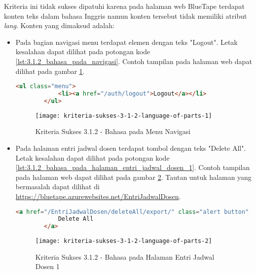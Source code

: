 Kriteria ini tidak sukses dipatuhi karena pada halaman web BlueTape terdapat konten teks dalam bahasa Inggris namun konten tersebut tidak memiliki atribut \textit{lang}. Konten yang dimaksud adalah:

\begin{itemize}
    \item Pada bagian navigasi menu terdapat elemen dengan teks "Logout". Letak kesalahan dapat dilihat pada potongan kode \ref{lst:3.1.2_bahasa_pada_navigasi}. Contoh tampilan pada halaman web dapat dilihat pada gambar \ref{fig:3.1.2_language_of_parts_1}. 
    \begin{lstlisting}[frame=single, label={lst:3.1.2_bahasa_pada_navigasi}, language=HTML, caption=Kriteria Sukses 3.1.2 - Bahasa yang Tidak Sesuai pada Menu Navigasi]
        <ul class="menu">
            <li><a href="/auth/logout">Logout</a></li>
        </ul>
    \end{lstlisting}
    
    \begin{figure}[H]
        \centering  
        \texttt{[image: kriteria-sukses-3-1-2-language-of-parts-1]}  
        \caption[Kriteria Sukses 3.1.2 - Bahasa pada Menu Navigasi]{Kriteria Sukses 3.1.2 - Bahasa pada Menu Navigasi}
        \label{fig:3.1.2_language_of_parts_1}  
    \end{figure}

    \item Pada halaman entri jadwal dosen terdapat tombol dengan teks "Delete All". Letak kesalahan dapat dilihat pada potongan kode \ref{lst:3.1.2_bahasa_pada_halaman_entri_jadwal_dosen_1}. Contoh tampilan pada halaman web dapat dilihat pada gambar \ref{fig:3.1.2_language_of_parts_2}. Tautan untuk halaman yang bermasalah dapat dilihat di \url{https://bluetape.azurewebsites.net/EntriJadwalDosen}.
    \begin{lstlisting}[frame=single, label={lst:3.1.2_bahasa_pada_halaman_entri_jadwal_dosen_1}, language=HTML, caption=Kriteria Sukses 3.1.2 - Bahasa yang Tidak Sesuai pada Halaman Entri Jadwal Dosen 1]
        <a href="/EntriJadwalDosen/deleteAll/export/" class="alert button" onClick="return konfirmasi();">
            Delete All
        </a>
    \end{lstlisting}
    
    \begin{figure}[H]
        \centering  
        \texttt{[image: kriteria-sukses-3-1-2-language-of-parts-2]}  
        \caption[Kriteria Sukses 3.1.2 - Bahasa pada Halaman Entri Jadwal Dosen 1]{Kriteria Sukses 3.1.2 - Bahasa pada Halaman Entri Jadwal Dosen 1}
        \label{fig:3.1.2_language_of_parts_2}  
    \end{figure}
    

\end{itemize}
